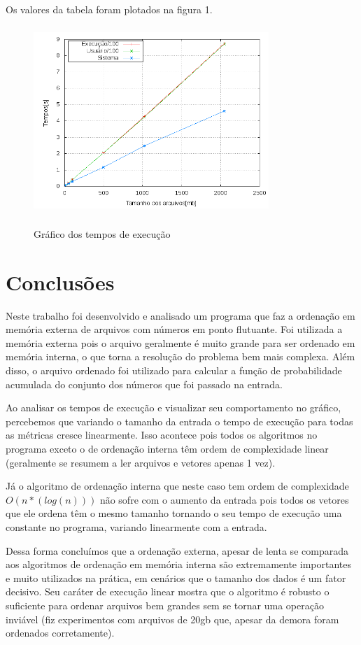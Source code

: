 \documentclass[12pt]{article}
\begin{document}
Os valores da tabela foram plotados na figura 1.

\begin{figure}[ht!]
\centering
\includegraphics[width=3.5in,height=2.8in]{avali.png}
\label{img:resss}
\caption{Gráfico dos tempos de execução}
\end{figure}

\section{Conclusões}
\label{conclusao}

Neste trabalho foi desenvolvido e analisado um programa que faz a ordenação em memória 
externa de arquivos com números em ponto flutuante. Foi utilizada a memória externa pois o arquivo
geralmente é muito grande para ser ordenado em memória interna, o que torna a resolução do problema
bem mais complexa. Além disso, o arquivo ordenado foi utilizado para calcular a função de probabilidade acumulada do conjunto dos números que foi passado na entrada.

Ao analisar os tempos de execução e visualizar seu comportamento no gráfico, percebemos que variando
o tamanho da entrada o tempo de execução para todas as métricas cresce linearmente. Isso acontece pois
 todos os algoritmos no programa exceto o de ordenação interna têm ordem de complexidade linear (geralmente se resumem a ler arquivos e vetores apenas 1 vez). 
 
Já o algoritmo de ordenação interna que neste caso tem ordem de complexidade $O(n*(log(n)))$ não sofre
 com o aumento da entrada pois todos os vetores que ele ordena têm o mesmo tamanho tornando o seu tempo de execução uma constante no programa, variando linearmente com a entrada.
 
Dessa forma concluímos que a ordenação externa, apesar de lenta se comparada aos algoritmos de ordenação 
em memória interna são extremamente importantes e muito utilizados na prática, em cenários que o tamanho
 dos dados é um fator decisivo. Seu caráter de execução linear mostra que o algoritmo é robusto o
 suficiente para ordenar arquivos bem grandes sem se tornar uma operação inviável (fiz experimentos com arquivos de 20gb que, apesar da demora foram ordenados corretamente).
\end{document}
